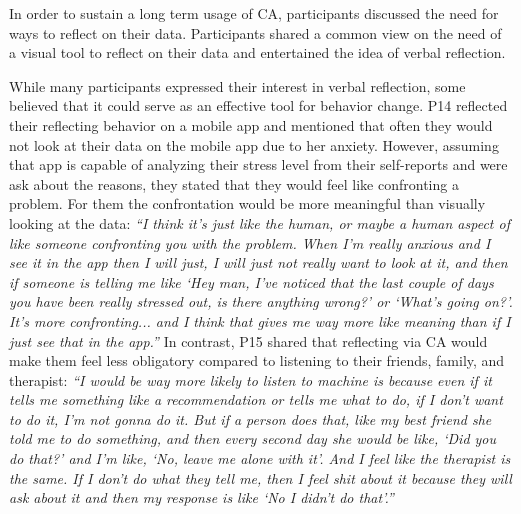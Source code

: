         In order to sustain a long term usage of \ac{CA}, participants discussed the need for ways to reflect on their data.
        Participants shared a common view on the need of a visual tool to reflect on their data and entertained the idea of verbal reflection. 
        
        
        While many participants expressed their interest in verbal reflection, some believed that it could serve as an effective tool for behavior change.
        P14 reflected their reflecting behavior on a mobile app and mentioned that often they would not look at their data on the mobile app due to her anxiety. However, assuming that \acl{app} is capable of analyzing their stress level from their self-reports and were ask about the reasons, they stated that they would feel like confronting a problem. For them the confrontation would be more meaningful than visually looking at the data:
        \textit{``I think it's just like the human, or maybe a human aspect of like someone confronting you with the problem. 
        When I'm really anxious and I see it in the app then I will just, I will just not really want to look at it, and then if someone is telling me like `Hey man, I've noticed that the last couple of days you have been really stressed out, is there anything wrong?' or `What's going on?'. It's more confronting...
        and I think that gives me way more like meaning than if I just see that in the app.''}
        In contrast, P15 shared that reflecting via \ac{CA} would make them feel less obligatory compared to listening to their friends, family, and therapist:
        \textit{``I would be way more likely to listen to machine is because even if it tells me something like a recommendation or tells me what to do, if I don't want to do it, I'm not gonna do it. But if a person does that,
        like my best friend she told me to do something, and then every second day she would be like, `Did you do that?' and I'm like, `No, leave me alone with it'. And I feel like the therapist is the same. If I don't do what they tell me, then I feel shit about it because they will ask about it and then my response is like `No I didn't do that'.''}
